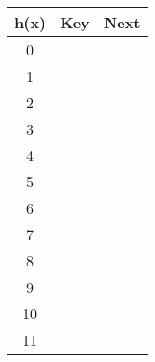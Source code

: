 \begin{tabular}{|c|c|c|}
\hline
h(x) & Key & Next \\ \hline\hline
0 & \hspace{1cm} & \hspace{1cm} \\ \hline
1 & \hspace{1cm} & \hspace{1cm} \\ \hline
2 & \hspace{1cm} & \hspace{1cm} \\ \hline
3 & \hspace{1cm} & \hspace{1cm} \\ \hline
4 & \hspace{1cm} & \hspace{1cm} \\ \hline
5 & \hspace{1cm} & \hspace{1cm} \\ \hline
6 & \hspace{1cm} & \hspace{1cm} \\ \hline
7 & \hspace{1cm} & \hspace{1cm} \\ \hline\hline
8 & \hspace{1cm} & \hspace{1cm} \\ \hline
9 & \hspace{1cm} & \hspace{1cm} \\ \hline
10 & \hspace{1cm} & \hspace{1cm} \\ \hline
11 & \hspace{1cm} & \hspace{1cm} \\ \hline
\end{tabular}
